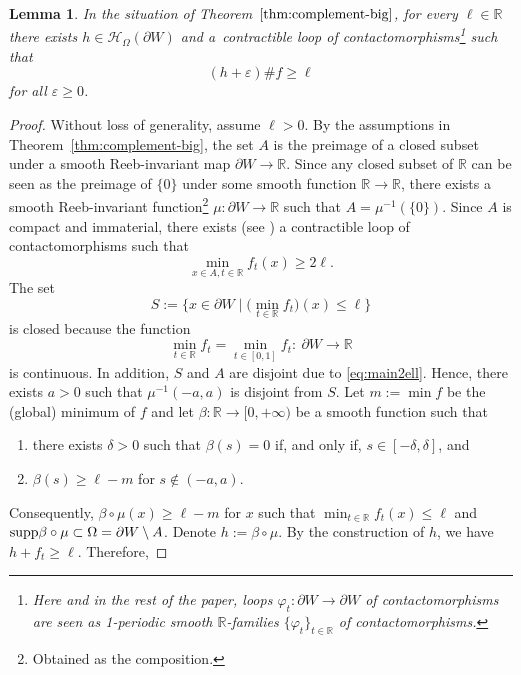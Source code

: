 \documentclass[pdftex]{sigma}
\numberwithin{equation}{section}
\newtheorem{Lemma}[Theorem]{Lemma}
\theoremstyle{definition}
\begin{document}
\begin{Lemma}\label{lem:twisttrick}
In the situation of Theorem~$\ref{thm:complement-big}$, for every $\ell\in\mathbb{R}$ there exists $h\in\mathcal{H}_{\Omega}(\partial W)$ and a~contractible loop  of contactomorphisms\footnote{Here and in the rest of the paper, loops $\varphi_t\colon \partial W\to\partial W$ of contactomorphisms are seen as 1-periodic smooth $\mathbb{R}$-families $\{\varphi_t\}_{t\in \mathbb{R}}$ of contactomorphisms.} such that
\[ (h+\varepsilon)\# f\geqslant \ell\]
for all $\varepsilon \geqslant 0$.
\end{Lemma}
\begin{proof}
Without loss of generality, assume $\ell>0$. By the assumptions in Theorem~\ref{thm:complement-big}, {the set $A$ is the preimage of a closed subset under a smooth Reeb-invariant map $\partial W\to\mathbb{R}$. Since any closed subset of $\mathbb{R}$ can be seen as the preimage of $\{0\}$ under some smooth function $\mathbb{R}\to\mathbb{R}$,} there exists a smooth Reeb-invariant function\footnote{{Obtained as the composition.}} $\mu\colon \partial W\to\mathbb{R}$ such that $A=\mu^{-1}(\{0\})$. Since $A$ is compact and immaterial, there exists (see \cite[Lemma~7.2]{uljarevic2023selective}) a contractible loop of contactomorphisms  such that
\begin{equation} \label{eq:main2ell}
\min_{x\in A, t\in\mathbb{R}} f_t(x)\geqslant 2\ell.
\end{equation}
The set
\[S:=\bigl\{ x\in\partial W\mid \bigl(\min_{t\in\mathbb{R}} f_t\bigr)(x)\leqslant \ell \bigr\}\]
is closed because the function
\[ \min_{t\in\mathbb{R}} f_t = \min_{t\in[0,1]} f_t \colon \ \partial W\to \mathbb{R} \]
is {continuous}. In addition, $S$ and $A$ are disjoint due to \eqref{eq:main2ell}. Hence, there exists $a>0$ such that $\mu^{-1}(-a, a)$ is disjoint from $S$. Let $m:=\min f$ be the (global) minimum of $f$ and let $\beta\colon \mathbb{R}\to[0,+\infty)$ be a smooth function such that
\begin{enumerate}\itemsep=0pt
\item[(1)] there exists $\delta>0$ such that $\beta(s)=0$ if, and only if, $s\in[-\delta, \delta]$, and
\item[(2)] $\beta(s)\geqslant \ell - m$ for $s\not\in (-a, a)$.
\end{enumerate}
Consequently, $\beta\circ \mu(x)\geqslant \ell-m$ for $x$ such that $\min_{t\in\mathbb{R}} f_t(x)\leqslant \ell$ and ${\rm supp} \beta\circ \mu \subset \Omega= \partial W\setminus A$. Denote $h:=\beta\circ\mu$. By the construction of $h$, we have $h+f_t\geqslant \ell$. Therefore,

\end{proof}
\end{document}
